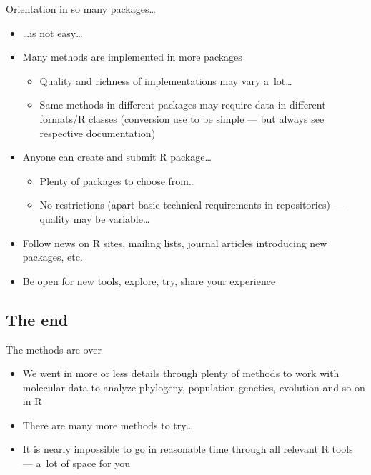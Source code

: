 \documentclass[compress, xelatex, 11pt, xcolor=svgnames, aspectratio=169, url={hyphens, lowtilde}]{beamer}
\begin{document}
\begin{frame}{Orientation in so many packages\ldots}
	\begin{itemize}
		\item \ldots is not easy\ldots
		\item Many methods are implemented in more packages
		\begin{itemize}
			\item Quality and richness of implementations may vary a~lot\ldots
			\item Same methods in different packages may require data in different formats/R classes (conversion use to be simple --- but always see respective documentation)
		\end{itemize}
		\item Anyone can create and submit R package\ldots
		\begin{itemize}
			\item Plenty of packages to choose from\ldots
			\item No restrictions (apart basic technical requirements in repositories) --- quality may be variable\ldots
		\end{itemize}
		\item Follow news on R sites, mailing lists, journal articles introducing new packages, etc.
		\item Be open for new tools, explore, try, share your experience
	\end{itemize}
\end{frame}

\subsection{The end}

\begin{frame}{The methods are over}
	\begin{itemize}
		\item We went in more or less details through plenty of methods to work with molecular data to analyze phylogeny, population genetics, evolution and so on in R
		\item There are many more methods to try\ldots
		\item It is nearly impossible to go in reasonable time through all relevant R tools --- a~lot of space for you
	\end{itemize}
\end{frame}
\end{document}
